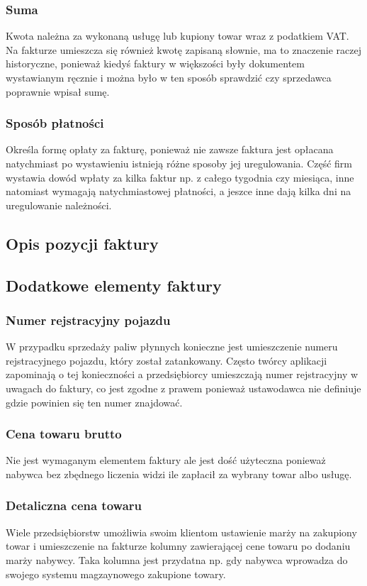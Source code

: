 \documentclass[12pt, a4paper]{article}
\begin{document}
\subsubsection{Suma}
Kwota należna za wykonaną usługę lub kupiony towar wraz z podatkiem VAT. Na
fakturze umieszcza się również kwotę zapisaną słownie, ma to znaczenie raczej
historyczne, ponieważ kiedyś faktury w większości były dokumentem wystawianym
ręcznie i można było w ten sposób sprawdzić czy sprzedawca poprawnie wpisał
sumę.
\subsubsection{Sposób płatności}
Określa formę opłaty za fakturę, ponieważ nie zawsze faktura jest opłacana
natychmiast po wystawieniu istnieją różne sposoby jej uregulowania. Część firm
wystawia dowód wpłaty za kilka faktur np. z całego tygodnia czy miesiąca, inne
natomiast wymagają natychmiastowej płatności, a jeszce inne dają kilka dni na
uregulowanie należności.
\subsection{Opis pozycji faktury}

\subsection{Dodatkowe elementy faktury}
\subsubsection{Numer rejstracyjny pojazdu}
W przypadku sprzedaży paliw płynnych konieczne jest umieszczenie numeru
rejstracyjnego pojazdu, który został zatankowany. Często twórcy aplikacji
zapominają o tej konieczności a przedsiębiorcy umieszczają numer rejstracyjny w
uwagach do faktury, co jest zgodne z prawem ponieważ ustawodawca nie definiuje
gdzie powinien się ten numer znajdować.
\subsubsection{Cena towaru brutto}
Nie jest wymaganym elementem faktury ale jest dość użyteczna ponieważ nabywca
bez zbędnego liczenia widzi ile zapłacił za wybrany towar albo usługę.
\subsubsection{Detaliczna cena towaru}
Wiele przedsiębiorstw umożliwia swoim klientom ustawienie marży na zakupiony
towar i umieszczenie na fakturze kolumny zawierającej cene towaru po dodaniu
marży nabywcy. Taka kolumna jest przydatna np. gdy nabywca wprowadza do swojego
systemu magzaynowego zakupione towary.
\end{document}
